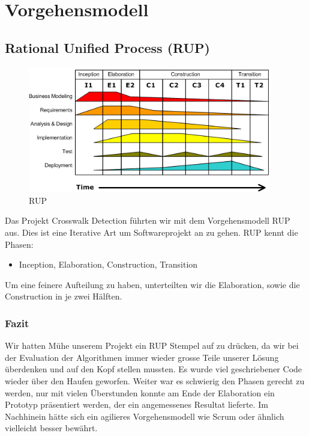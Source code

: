 \section{Vorgehensmodell}
\subsection{Rational Unified Process (RUP)}

\begin{figure}[H]
\centering
\includegraphics[width=300pt]{images/rup.png}
\caption[RUP]{RUP}
\end{figure}

Das Projekt Crosswalk Detection führten wir mit dem Vorgehensmodell RUP \cite{RUP} aus.
Dies ist eine Iterative Art um Softwareprojekt an zu gehen. RUP kennt die Phasen:

\begin{itemize}
	\item Inception, Elaboration, Construction, Transition
\end{itemize}

Um eine feinere Aufteilung zu haben, unterteilten wir die Elaboration, sowie die Construction in je zwei Hälften. 

\subsubsection{Fazit}
Wir hatten Mühe unserem Projekt ein RUP Stempel auf zu drücken, da wir bei der Evaluation der Algorithmen immer wieder grosse Teile unserer Lösung überdenken und auf den Kopf stellen mussten. Es wurde viel geschriebener Code wieder über den Haufen geworfen. Weiter war es schwierig den Phasen gerecht zu werden, nur mit vielen Überstunden konnte am Ende der Elaboration ein Prototyp präsentiert werden, der ein angemessenes Resultat lieferte. Im Nachhinein hätte sich ein agilieres Vorgehensmodell wie Scrum oder ähnlich vielleicht besser bewährt.
 

